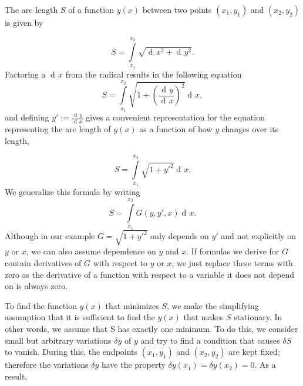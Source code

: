 \documentclass[prb,preprint]{revtex4-1}
\DeclareMathOperator{\dd}{d\!}
\begin{document}
The arc length $S$ of a function $y(x)$ between two points $(x_1,y_1)$ and $(x_2,y_2)$ is given by

\begin{equation}
S=\int\limits_{x_1}^{x_2}\sqrt{\dd x^2 + \dd y^2}.
\end{equation}
Factoring a $\dd x$ from the radical results in the following equation
\begin{equation}
S= \int\limits_{x_1}^{x_2}\sqrt{1 + \left(\frac{\dd y}{\dd x}\right)^2} \dd x,
\end{equation}
and defining $y' := \frac{\dd y}{\dd x}$ gives a convenient representation for the equation representing the arc length of $y(x)$ as a function of how $y$ changes over its length, %

\begin{equation}
S = \int\limits_{x_1}^{x_2}\sqrt{1 + y'^2} \dd x.
\end{equation}
We generalize this formula by writing
\begin{equation}
S=\int\limits_{x_1}^{x_2} G(y,y',x) \dd x .
\end{equation}
Although in our example $G = \sqrt{1 + y'^2}$ only depends on $y'$ and not explicitly on $y$ or $x$, we can also assume dependence on $y$ and $x$. %
If formulas we derive for $G$ contain derivatives of $G$ with respect to $y$ or $x$, we just replace these terms with zero as the derivative of a function with respect to a variable it does not depend on is always zero.


To find the function $y(x)$ that minimizes $S$, we make the simplifying assumption that it is sufficient to find the $y(x)$ that makes $S$ stationary. In other words, we assume that S has exactly one minimum.
To do this, we consider small but arbitrary variations $\delta y$ of $y$ and try to find a condition that causes $\delta S$ to vanish. 
During this, the endpoints $(x_1,y_1)$ and $(x_2,y_2)$ are kept fixed; therefore the variations $\delta y$ have the property $\delta y(x_1) = \delta y(x_2) = 0$. 
As a result,
\end{document}

